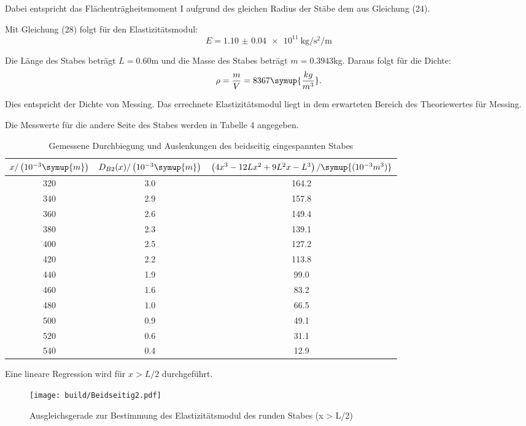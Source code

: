 Dabei entspricht das Flächenträgheitsmoment I aufgrund des gleichen Radius der Stäbe
dem aus Gleichung (24).

Mit Gleichung (28) folgt für den Elastizitätsmodul:
\begin{equation}
  E = \SI{1.10(4)e11}{\kilo\gram\per\second\squared\per\meter}
\end{equation}

Die Länge des Stabes beträgt $L = 0.60$m und die Masse des Stabes beträgt $m = 0.3943$kg.
Daraus folgt für die Dichte:
\begin{equation}
  \rho = \frac{m}{V} = 8367 \symup{\frac{kg}{m^3}} .
\end{equation}

Dies entspricht der Dichte von Messing. Das errechnete Elastizitätsmodul liegt in dem
erwarteten Bereich des Theoriewertes für Messing.

Die Messwerte für die andere Seite des Stabes werden in Tabelle 4 angegeben.

\begin{table}[H]
  \centering
  \caption{Gemessene Durchbiegung und Auslenkungen des beidseitig eingespannten Stabes}
  \label{tab:beidseitig}
  \begin{tabular}{c c c}
    \toprule
    $x/\left(10^{-3}\symup{m}\right)$ & $D_{B2}(x)/\left(10^{-3}\symup{m}\right)$ & $\left(4x^3-12Lx^2 + 9L^2x-L^3\right)/\symup{(10^{-3}m^3)}$ \\
    \midrule
    320 & 3.0 & 164.2 \\
    340 & 2.9 & 157.8 \\
    360 & 2.6 & 149.4 \\
    380 & 2.3 & 139.1 \\
    400 & 2.5 & 127.2 \\
    420 & 2.2 & 113.8 \\
    440 & 1.9 & 99.0 \\
    460 & 1.6 & 83.2 \\
    480 & 1.0 & 66.5 \\
    500 & 0.9 & 49.1 \\
    520 & 0.6 & 31.1 \\
    540 & 0.4 & 12.9 \\
    \bottomrule
  \end{tabular}
\end{table}

Eine lineare Regression wird für $x>L/2$ durchgeführt.

\begin{figure}[H]
  \centering
  \texttt{[image: build/Beidseitig2.pdf]}
  \caption{Ausgleichsgerade zur Bestimmung des Elastizitätsmodul des runden Stabes (x > L/2)}
  \label{fig:Elastizitätsmodul des runden Stabes1}
\end{figure}

